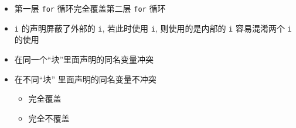 \begin{frame}[fragile]
{{{{                \begin{itemize}
                    \item<4-> 第一层 \lstinline|for| 循环完全覆盖第二层 \lstinline|for| 循环
                    \item<5-> \lstinline|i| 的声明屏蔽了外部的 \lstinline|i|, 若此时使用 \lstinline|i|, 
                            则使用的是内部的 \lstinline|i| 容易混淆两个 \lstinline|i| 的使用
                \end{itemize}
            } {
                \begin{itemize}
                    \item 在同一个“块”里面声明的同名变量冲突
                    \item 在不同“块” 里面声明的同名变量不冲突

                    \begin{itemize}
                        \item 完全覆盖
                        \item 完全不覆盖
                    \end{itemize}
                    
                \end{itemize}
            }
        }
    }
    }
    
\end{frame}

